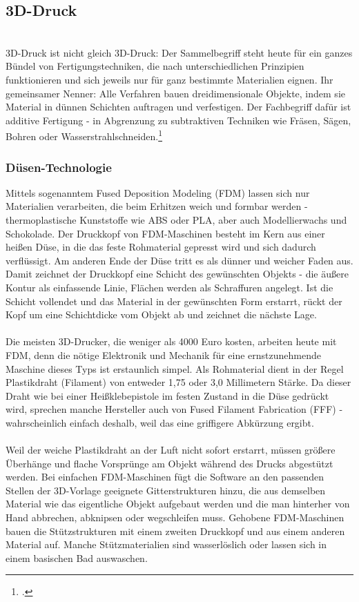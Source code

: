 \subsection{3D-Druck}\ \\
3D-Druck ist nicht gleich 3D-Druck: Der Sammelbegriff steht heute für ein ganzes Bündel von Fertigungstechniken, die nach unterschiedlichen Prinzipien funktionieren und sich jeweils nur für ganz bestimmte Materialien eignen. Ihr gemeinsamer Nenner: Alle Verfahren bauen dreidimensionale Objekte, indem sie Material in dünnen Schichten auftragen und verfestigen. Der Fachbegriff dafür ist additive Fertigung - in Abgrenzung zu subtraktiven Techniken wie Fräsen, Sägen, Bohren oder Wasserstrahlschneiden.\footcite{shit_3d_spiegel}

\subsubsection{Düsen-Technologie}
Mittels sogenanntem Fused Deposition Modeling (FDM) lassen sich nur Materialien verarbeiten, die beim Erhitzen weich und formbar werden - thermoplastische Kunststoffe wie ABS oder PLA, aber auch Modellierwachs und Schokolade. Der Druckkopf von FDM-Maschinen besteht im Kern aus einer heißen Düse, in die das feste Rohmaterial gepresst wird und sich dadurch verflüssigt. Am anderen Ende der Düse tritt es als dünner und weicher Faden aus. Damit zeichnet der Druckkopf eine Schicht des gewünschten Objekts - die äußere Kontur als einfassende Linie, Flächen werden als Schraffuren angelegt. Ist die Schicht vollendet und das Material in der gewünschten Form erstarrt, rückt der Kopf um eine Schichtdicke vom Objekt ab und zeichnet die nächste Lage.\\
\\
Die meisten 3D-Drucker, die weniger als 4000 Euro kosten, arbeiten heute mit FDM, denn die nötige Elektronik und Mechanik für eine ernstzunehmende Maschine dieses Typs ist erstaunlich simpel. Als Rohmaterial dient in der Regel Plastikdraht (Filament) von entweder 1,75 oder 3,0 Millimetern Stärke. Da dieser Draht wie bei einer Heißklebepistole im festen Zustand in die Düse gedrückt wird, sprechen manche Hersteller auch von Fused Filament Fabrication (FFF) - wahrscheinlich einfach deshalb, weil das eine griffigere Abkürzung ergibt.\\
\\
Weil der weiche Plastikdraht an der Luft nicht sofort erstarrt, müssen größere Überhänge und flache Vorsprünge am Objekt während des Drucks abgestützt werden. Bei einfachen FDM-Maschinen fügt die Software an den passenden Stellen der 3D-Vorlage geeignete Gitterstrukturen hinzu, die aus demselben Material wie das eigentliche Objekt aufgebaut werden und die man hinterher von Hand abbrechen, abknipsen oder wegschleifen muss. Gehobene FDM-Maschinen bauen die Stützstrukturen mit einem zweiten Druckkopf und aus einem anderen Material auf. Manche Stützmaterialien sind wasserlöslich oder lassen sich in einem basischen Bad auswaschen.\\
